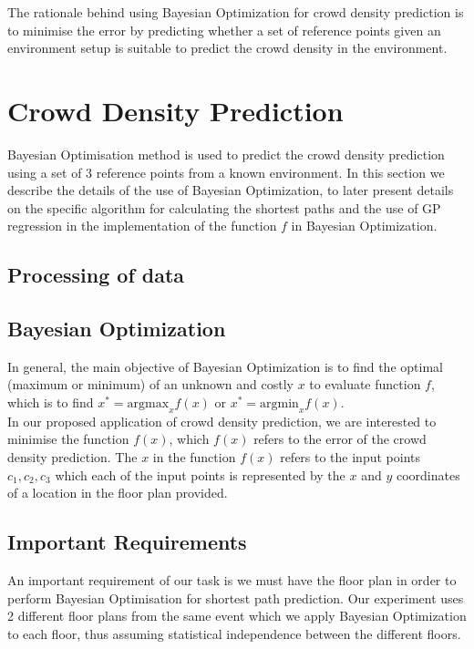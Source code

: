 \documentclass[letterpaper]{article}
\begin{document}
The rationale behind using Bayesian Optimization for crowd density prediction is to minimise the error by predicting whether a set of reference points given an environment setup is suitable to predict the crowd density in the environment.

\section{Crowd Density Prediction}

Bayesian Optimisation method is used to predict the crowd density prediction using a set of $3$ reference points from a known environment. In this section we describe the details of the use of Bayesian Optimization, to later present details on the specific algorithm for calculating the shortest paths and the use of GP regression in the implementation of the function $f$ in Bayesian Optimization.

\subsection{Processing of data}

\subsection{Bayesian Optimization}

In general, the main objective of Bayesian Optimization is to find the optimal (maximum or minimum) of an unknown and costly $x$ to evaluate function $f$, which is to find $x^* = \text{argmax}_x f(x)$ or $x^* = \text{argmin}_x f(x)$. \\

In our proposed application of crowd density prediction, we are interested to minimise the function $f(x)$, which $f(x)$ refers to the error of the crowd density prediction. The $x$ in the function $f(x)$ refers to the input points $c_1, c_2, c_3$ which each of the input points is represented by the $x$ and $y$ coordinates of a location in the floor plan provided.   



\subsection{Important Requirements}

An important requirement of our task is we must have the floor plan in order to perform Bayesian Optimisation for shortest path prediction. Our experiment uses 2 different floor plans from the same event which we apply Bayesian Optimization to each floor, thus assuming statistical independence between the different floors. \\
\end{document}
